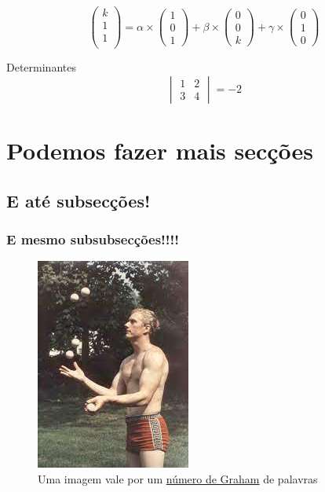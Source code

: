 \documentclass[10pt]{article}
\begin{document}
$$
\begin{pmatrix}
k \\ 1 \\ 1\\
\end{pmatrix}
=
\alpha\times\begin{pmatrix}
1 \\ 0 \\ 1
\end{pmatrix}
+
\beta\times\begin{pmatrix}
0 \\ 0 \\ k
\end{pmatrix}
+
\gamma\times\begin{pmatrix}
0 \\ 1 \\ 0
\end{pmatrix}
$$

Determinantes
$$\begin{vmatrix}
1 & 2\\
3 & 4
\end{vmatrix} = -2$$

\section{Podemos fazer mais secções}
\subsection{E até subsecções!}
\subsubsection{E mesmo subsubsecções!!!!} 

\begin{figure}[H]
    \centering
    \includegraphics[width=.2\linewidth]{ron_graham_juggling.jpeg}
    \caption{Uma imagem vale por um \href{https://www.youtube.com/watch?v=XTeJ64KD5cg}{número de Graham} de palavras}
    \label{fig:my_label}
\end{figure}
\end{document}
